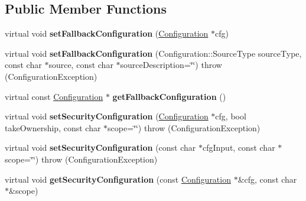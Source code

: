 \subsection*{Public Member Functions}
\begin{DoxyCompactItemize}
\item 
\hypertarget{classCONFIG4CPP__NAMESPACE_1_1ConfigurationImpl_ad14bdefa48472b366e67fb1b549c5d9f}{virtual void {\bfseries set\-Fallback\-Configuration} (\hyperlink{classCONFIG4CPP__NAMESPACE_1_1Configuration}{Configuration} $\ast$cfg)}\label{classCONFIG4CPP__NAMESPACE_1_1ConfigurationImpl_ad14bdefa48472b366e67fb1b549c5d9f}

\item 
\hypertarget{classCONFIG4CPP__NAMESPACE_1_1ConfigurationImpl_ad5b85c0eb0f7e8af317f0bfaa015101a}{virtual void {\bfseries set\-Fallback\-Configuration} (Configuration\-::\-Source\-Type source\-Type, const char $\ast$source, const char $\ast$source\-Description=\char`\"{}\char`\"{})  throw (\-Configuration\-Exception)}\label{classCONFIG4CPP__NAMESPACE_1_1ConfigurationImpl_ad5b85c0eb0f7e8af317f0bfaa015101a}

\item 
\hypertarget{classCONFIG4CPP__NAMESPACE_1_1ConfigurationImpl_af93de4baebfdf1d1a6425292bb6269fc}{virtual const \hyperlink{classCONFIG4CPP__NAMESPACE_1_1Configuration}{Configuration} $\ast$ {\bfseries get\-Fallback\-Configuration} ()}\label{classCONFIG4CPP__NAMESPACE_1_1ConfigurationImpl_af93de4baebfdf1d1a6425292bb6269fc}

\item 
\hypertarget{classCONFIG4CPP__NAMESPACE_1_1ConfigurationImpl_a20fb84b7845206d9b44f3703b82668e2}{virtual void {\bfseries set\-Security\-Configuration} (\hyperlink{classCONFIG4CPP__NAMESPACE_1_1Configuration}{Configuration} $\ast$cfg, bool take\-Ownership, const char $\ast$scope=\char`\"{}\char`\"{})  throw (\-Configuration\-Exception)}\label{classCONFIG4CPP__NAMESPACE_1_1ConfigurationImpl_a20fb84b7845206d9b44f3703b82668e2}

\item 
\hypertarget{classCONFIG4CPP__NAMESPACE_1_1ConfigurationImpl_af28f20be9686e4ccacab522182a0ec2b}{virtual void {\bfseries set\-Security\-Configuration} (const char $\ast$cfg\-Input, const char $\ast$scope=\char`\"{}\char`\"{})  throw (\-Configuration\-Exception)}\label{classCONFIG4CPP__NAMESPACE_1_1ConfigurationImpl_af28f20be9686e4ccacab522182a0ec2b}

\item 
\hypertarget{classCONFIG4CPP__NAMESPACE_1_1ConfigurationImpl_abe6da19af65d96835ffe952b385fbb3a}{virtual void {\bfseries get\-Security\-Configuration} (const \hyperlink{classCONFIG4CPP__NAMESPACE_1_1Configuration}{Configuration} $\ast$\&cfg, const char $\ast$\&scope)}\label{classCONFIG4CPP__NAMESPACE_1_1ConfigurationImpl_abe6da19af65d96835ffe952b385fbb3a}


\end{DoxyCompactItemize}
